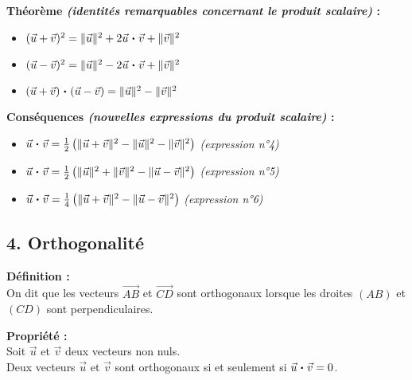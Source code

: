 \documentclass[11pt,a4paper]{article}
\newcommand{\pdt}{\mathbin{\vcenter{\hbox{\scalebox{0.6}{\textbullet}}}}}
\begin{document}
\begin{mdframed}[style=proprieteStyle]
    \textbf{Théorème \emph{(identités remarquables concernant le produit scalaire)} :}
    \begin{itemize}
        \item $(\vec{u}+\vec{v})^2=\|\vec{u}\|^2+2\vec{u}\pdt\vec{v}+\|\vec{v}\|^2$
        \item $(\vec{u}-\vec{v})^2=\|\vec{u}\|^2-2\vec{u}\pdt\vec{v}+\|\vec{v}\|^2$
        \item $(\vec{u}+\vec{v})\pdt(\vec{u}-\vec{v})=\|\vec{u}\|^2-\|\vec{v}\|^2$
    \end{itemize}
\end{mdframed}

\begin{mdframed}[style=proprieteStyle]
    \textbf{Conséquences \emph{(nouvelles expressions du produit scalaire)} :}
    \begin{itemize}
        \item $\vec{u}\pdt\vec{v}=\frac{1}{2}\left( \| \vec{u}+\vec{v} \|^2 - \|\vec{u}\|^2 - \|\vec{v}\|^2 \right)$ \quad \emph{(expression n°4)}
        \item $\vec{u}\pdt\vec{v}=\frac{1}{2}\left(\|\vec{u}\|^2 + \|\vec{v}\|^2 - \| \vec{u}-\vec{v} \|^2 \right)$ \quad \emph{(expression n°5)}
        \item $\vec{u}\pdt\vec{v}=\frac{1}{4}\left( \| \vec{u}+\vec{v} \|^2 - \| \vec{u}-\vec{v} \|^2 \right)$ \quad \emph{(expression n°6)}
    \end{itemize}
\end{mdframed}

\subsection*{4. Orthogonalité}

\begin{mdframed}[style=definitionStyle]
    \textbf{Définition :} ~\\
    On dit que les vecteurs $\overrightarrow{AB}$ et $\overrightarrow{CD}$ sont orthogonaux lorsque les droites $(AB)$ et $(CD)$ sont perpendiculaires.
\end{mdframed}

\begin{mdframed}[style=proprieteStyle]
    \textbf{Propriété :} ~\\
    Soit $\vec{u}$ et $\vec{v}$ deux vecteurs non nuls. \\
    Deux vecteurs $\vec{u}$ et $\vec{v}$ sont orthogonaux si et seulement si $\vec{u}\pdt\vec{v}=0$.
\end{mdframed}
\end{document}
